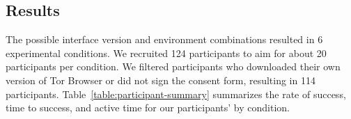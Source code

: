 \documentclass[USenglish,oneside,twocolumn]{article}
\begin{document}
\subsection{Results} 
{\color {red} 
The possible interface version and environment combinations resulted in 6 experimental conditions. We recruited 124 participants to aim for about 20 participants per condition. We filtered participants who downloaded their own version of Tor Browser or did not sign the consent form, resulting in 114 participants. Table~\ref{table:participant-summary} summarizes the rate of success, time to success, and active time for our participants' by condition. 





}
\end{document}
